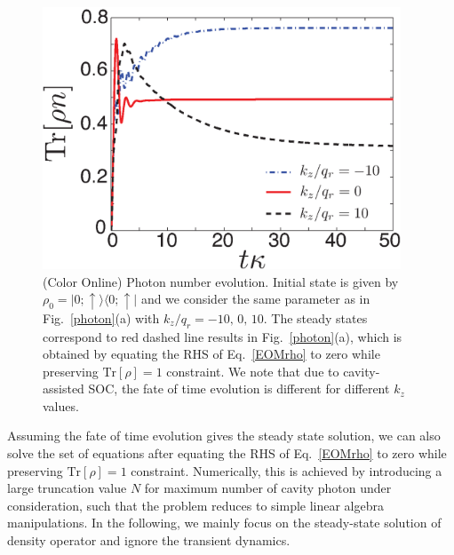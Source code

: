 \documentclass[atoms,article,submit,moreauthors,pdftex,12pt,a4paper]{mdpi}
\begin{document}
\begin{figure}[htp]
\includegraphics[width=0.95\textwidth]{photon_evolution}\caption{(Color Online) Photon number evolution. Initial state is given by $\rho_0=|0;\uparrow\rangle\langle0;\uparrow|$ and we consider the same parameter as in Fig.~\ref{photon}(a) with $k_z/q_r=-10,\,0,\,10$. The steady states correspond to red dashed line results in Fig.~\ref{photon}(a), which is obtained by equating the RHS of Eq.~\ref{EOMrho} to zero while preserving $\text{Tr}[\rho]=1$ constraint. We note that due to cavity-assisted SOC, the fate of time evolution is different for different $k_z$ values.  }\label{evo}
\end{figure}

Assuming the fate of time evolution gives the steady state solution, we can also solve the set of equations after equating the RHS of Eq.~\ref{EOMrho} to zero while preserving $\text{Tr}[\rho]=1$ constraint. Numerically, this is achieved by introducing a large truncation value $N$ for maximum number of cavity photon under consideration, such that the problem reduces to simple linear algebra manipulations. In the following, we mainly focus on the steady-state solution of density operator and ignore the transient dynamics.
\end{document}
